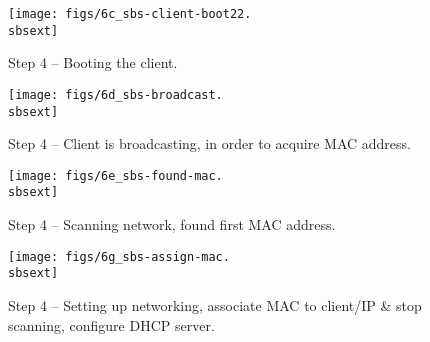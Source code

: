 \clearpage


\begin{figure}[htbp]
  \begin{center}
    \texttt{[image: figs/6c\_sbs-client-boot22.\\sbsext]}
    \caption{Step 4 -- Booting the client.}
    \label{fig:sbs-client-boot3}
  \end{center}
\end{figure}

\begin{figure}[htbp]
  \begin{center}
    \texttt{[image: figs/6d\_sbs-broadcast.\\sbsext]}
    \caption{Step 4 -- Client is broadcasting, in order to acquire MAC address.}
    \label{fig:sbs-collect-broadcast}
  \end{center}
\end{figure}



\clearpage

\begin{figure}[htbp]
  \begin{center}
    \texttt{[image: figs/6e\_sbs-found-mac.\\sbsext]}
    \caption{Step 4 -- Scanning network, found first MAC address.}
    \label{fig:sbs-setup-network2}
  \end{center}
\end{figure}



\begin{figure}[htbp]
  \begin{center}
    \texttt{[image: figs/6g\_sbs-assign-mac.\\sbsext]}
    \caption{Step 4 -- Setting up networking, associate MAC to
	client/IP \& stop scanning, configure DHCP server.}
    \label{fig:sbs-setup-network4}
  \end{center}
\end{figure}

